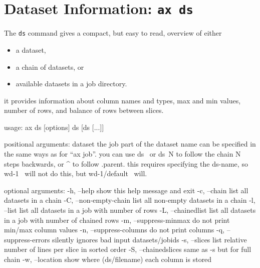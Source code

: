 \section{Dataset Information: \texttt{ax ds}}
The \texttt{ds} command gives a compact, but easy to read,
overview of either
\begin{itemize}
\item[] a dataset,
\item[] a chain of datasets, or
\item[] available datasets in a job directory.
\end{itemize}
it provides information about column names and types, max and min
values, number of rows, and balance of rows between slices.
\begin{shell}
  usage: ax ds [options] ds [ds [...]]

  positional arguments:
  dataset                the job part of the dataset name can be specified in
                         the same ways as for ``ax job''. you can use ds~ or
                         ds~N to follow the chain N steps backwards, or ^ to
                         follow .parent. this requires specifying the ds-name,
                         so wd-1~ will not do this, but wd-1/default~ will.

  optional arguments:
  -h, --help             show this help message and exit
  -c, --chain            list all datasets in a chain
  -C, --non-empty-chain  list all non-empty datasets in a chain
  -l, --list             list all datasets in a job with number of rows
  -L, --chainedlist      list all datasets in a job with number of chained rows
  -m, --suppress-minmax  do not print min/max column values
  -n, --suppress-columns do not print columns
  -q, --suppress-errors  silently ignores bad input datasets/jobids
  -s, --slices           list relative number of lines per slice in sorted order
  -S, --chainedslices    same as -s but for full chain
  -w, --location         show where (ds/filename) each column is stored
\end{shell}

